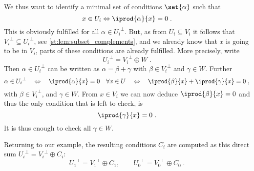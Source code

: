 We thus want to identify a minimal set of conditions $\set{\alpha}$ such that
\begin{equation*}
    x \in U_i \Leftrightarrow \iprod{\alpha}{x} = 0\;.
\end{equation*}
This is obviously fulfilled for all $\alpha \in {U_i}^\perp$.
But, as from $U_i \subseteq V_i$ it follows that ${V_i}^\perp \subseteq {U_i}^\perp$, see \cref{st:lem:subset_complements}, and we already know that $x$ is going to be in $V_i$, parts of these conditions are already fulfilled.
More precisely, write
\begin{equation*}
    {U_i}^\perp = {V_i}^\perp \oplus W\;.
\end{equation*}
Then $\alpha \in {U_i}^\perp$ can be written as $\alpha = \beta + \gamma$ with $\beta \in {V_i}^\perp$ and $\gamma \in W$.
Further
\begin{equation*}
    \alpha \in {U_i}^\perp
    \quad \Leftrightarrow \quad
    \iprod{\alpha}{x} = 0 \quad \forall x \in U
    \quad \Leftrightarrow \quad
    \iprod{\beta}{x} + \iprod{\gamma}{x} = 0\;,
\end{equation*}
with $\beta \in {V_i}^\perp$, and $\gamma \in W$.
From $x \in V_i$ we can now deduce $\iprod{\beta}{x} = 0$ and thus the only condition that is left to check, is
\begin{equation*}
    \iprod{\gamma}{x} = 0\;.
\end{equation*}
It is thus enough to check all $\gamma \in W$.

Returning to our example, the resulting conditions $C_i$ are computed as this direct sum ${U_i}^\perp = {V_i}^\perp \oplus C_i$:
\begin{equation*}
    {U_1}^\perp = {V_1}^\perp \oplus C_1, \qquad {U_0}^\perp = {V_0}^\perp \oplus C_0\;.
\end{equation*}

